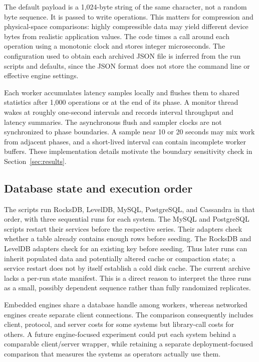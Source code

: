 \documentclass[10pt]{article}
\begin{document}
The default payload is a 1,024-byte string of the same character, not a random byte sequence. It is passed to write operations. This matters for compression and physical-space comparisons: highly compressible data may yield different device bytes from realistic application values. The code times a call around each operation using a monotonic clock and stores integer microseconds. The configuration used to obtain each archived JSON file is inferred from the run scripts and defaults, since the JSON format does not store the command line or effective engine settings.

Each worker accumulates latency samples locally and flushes them to shared statistics after 1,000 operations or at the end of its phase. A monitor thread wakes at roughly one-second intervals and records interval throughput and latency summaries. The asynchronous flush and sampler clocks are not synchronized to phase boundaries. A sample near 10 or 20 seconds may mix work from adjacent phases, and a short-lived interval can contain incomplete worker buffers. These implementation details motivate the boundary sensitivity check in Section~\ref{sec:results}.

\subsection{Database state and execution order}
The scripts run RocksDB, LevelDB, MySQL, PostgreSQL, and Cassandra in that order, with three sequential runs for each system. The MySQL and PostgreSQL scripts restart their services before the respective series. Their adapters check whether a table already contains enough rows before seeding. The RocksDB and LevelDB adapters check for an existing key before seeding. Thus later runs can inherit populated data and potentially altered cache or compaction state; a service restart does not by itself establish a cold disk cache. The current archive lacks a per-run state manifest. This is a direct reason to interpret the three runs as a small, possibly dependent sequence rather than fully randomized replicates.

Embedded engines share a database handle among workers, whereas networked engines create separate client connections. The comparison consequently includes client, protocol, and server costs for some systems but library-call costs for others. A future engine-focused experiment could put each system behind a comparable client/server wrapper, while retaining a separate deployment-focused comparison that measures the systems as operators actually use them.
\end{document}
